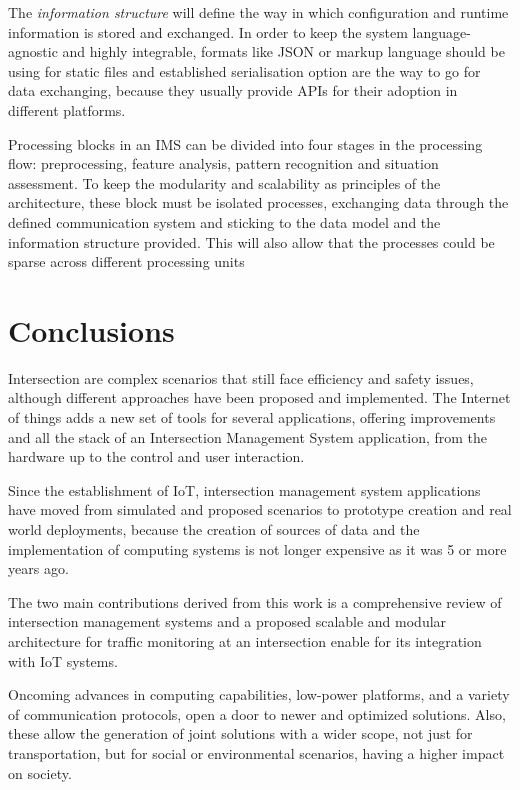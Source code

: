 \documentclass[conference]{IEEEtran}
\begin{document}
The \textit{information structure} will define the way in which configuration and runtime information is stored and exchanged. In order to keep the system language-agnostic and highly integrable, formats like JSON or markup language should be using for static files and established serialisation option are the way to go for data exchanging, because they usually provide APIs for their adoption in different platforms.

Processing blocks in an IMS can be divided into four stages in the processing flow: preprocessing, feature analysis, pattern recognition and situation assessment. To keep the modularity and scalability as principles of the architecture, these block must be isolated processes, exchanging data through the defined communication system and sticking to the data model and the information structure provided. This will also allow that the processes could be sparse across different processing units




\section{Conclusions}

Intersection are complex scenarios that still face efficiency and safety issues, although different approaches have been proposed and implemented. The Internet of things adds a new set of tools for several applications, offering improvements and all the stack of an Intersection Management System application, from the hardware up to the control and user interaction.

Since the establishment of IoT, intersection management system applications have moved from simulated and proposed scenarios to prototype creation and real world deployments, because the creation of sources of data and the implementation of computing systems is not longer expensive as it was 5 or more years ago.

The two main contributions derived from this work is a comprehensive review of intersection management systems and a proposed scalable and modular architecture for traffic monitoring at an intersection enable for its integration with IoT systems.

Oncoming advances in computing capabilities, low-power platforms, and a variety of communication protocols, open a door to newer and optimized solutions. Also, these allow the generation of joint solutions with a wider scope, not just for transportation, but for social or environmental scenarios, having a higher impact on society.



\end{document}
